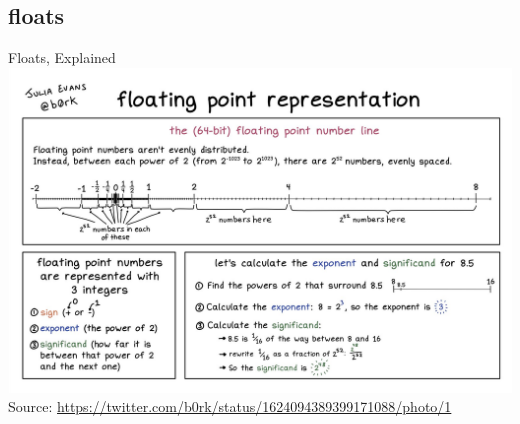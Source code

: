 \documentclass{beamer}
\begin{document}
\subsection{floats}
\begin{frame}{Floats, Explained}
\includegraphics[scale=0.204]{FloatsMeme.jpeg}
\footnotesize Source: \url{https://twitter.com/b0rk/status/1624094389399171088/photo/1}
\end{frame}
\end{document}
